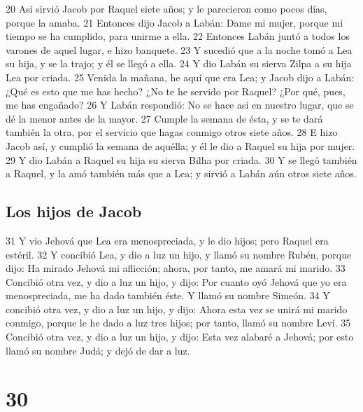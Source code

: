 20 Así sirvió Jacob por Raquel siete años; y le parecieron como pocos días, porque la amaba.
21 Entonces dijo Jacob a Labán: Dame mi mujer, porque mi tiempo se ha cumplido, para unirme a ella.
22 Entonces Labán juntó a todos los varones de aquel lugar, e hizo banquete.
23 Y sucedió que a la noche tomó a Lea su hija, y se la trajo; y él se llegó a ella.
24 Y dio Labán su sierva Zilpa a su hija Lea por criada.
25 Venida la mañana, he aquí que era Lea; y Jacob dijo a Labán: ¿Qué es esto que me has hecho? ¿No te he servido por Raquel? ¿Por qué, pues, me has engañado?
26 Y Labán respondió: No se hace así en nuestro lugar, que se dé la menor antes de la mayor.
27 Cumple la semana de ésta, y se te dará también la otra, por el servicio que hagas conmigo otros siete años.
28 E hizo Jacob así, y cumplió la semana de aquélla; y él le dio a Raquel su hija por mujer.
29 Y dio Labán a Raquel su hija su sierva Bilha por criada.
30 Y se llegó también a Raquel, y la amó también más que a Lea; y sirvió a Labán aún otros siete años.

\section*{Los hijos de Jacob}

31 Y vio Jehová que Lea era menospreciada, y le dio hijos; pero Raquel era estéril.
32 Y concibió Lea, y dio a luz un hijo, y llamó su nombre Rubén, porque dijo: Ha mirado Jehová mi aflicción; ahora, por tanto, me amará mi marido.
33 Concibió otra vez, y dio a luz un hijo, y dijo: Por cuanto oyó Jehová que yo era menospreciada, me ha dado también éste. Y llamó su nombre Simeón.
34 Y concibió otra vez, y dio a luz un hijo, y dijo: Ahora esta vez se unirá mi marido conmigo, porque le he dado a luz tres hijos; por tanto, llamó su nombre Leví.
35 Concibió otra vez, y dio a luz un hijo, y dijo: Esta vez alabaré a Jehová; por esto llamó su nombre Judá; y dejó de dar a luz.

\chapter{30}

